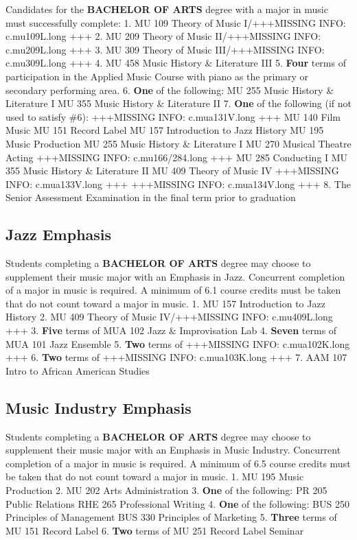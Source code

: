 \documentclass[
  letterpaper,
]{scrbook}
\begin{document}
Candidates for the \textbf{BACHELOR OF ARTS} degree with a major in
music must successfully complete: 1. MU 109 Theory of Music I/+++MISSING
INFO: c.mu109L.long +++ 2. MU 209 Theory of Music II/+++MISSING INFO:
c.mu209L.long +++ 3. MU 309 Theory of Music III/+++MISSING INFO:
c.mu309L.long +++ 4. MU 458 Music History \& Literature III 5.
\textbf{Four} terms of participation in the Applied Music Course with
piano as the primary or secondary performing area. 6. \textbf{One} of
the following: MU 255 Music History \& Literature I MU 355 Music History
\& Literature II 7. \textbf{One} of the following (if not used to
satisfy \#6): +++MISSING INFO: c.mua131V.long +++ MU 140 Film Music MU
151 Record Label MU 157 Introduction to Jazz History MU 195 Music
Production MU 255 Music History \& Literature I MU 270 Musical Theatre
Acting +++MISSING INFO: c.mu166/284.long +++ MU 285 Conducting I MU 355
Music History \& Literature II MU 409 Theory of Music IV +++MISSING
INFO: c.mua133V.long +++ +++MISSING INFO: c.mua134V.long +++ 8. The
Senior Assessment Examination in the final term prior to graduation

\hypertarget{jazz-emphasis}{%
\subsection{Jazz Emphasis}\label{jazz-emphasis}}

Students completing a \textbf{BACHELOR OF ARTS} degree may choose to
supplement their music major with an Emphasis in Jazz. Concurrent
completion of a major in music is required. A minimum of 6.1 course
credits must be taken that do not count toward a major in music. 1. MU
157 Introduction to Jazz History 2. MU 409 Theory of Music IV/+++MISSING
INFO: c.mu409L.long +++ 3. \textbf{Five} terms of MUA 102 Jazz \&
Improvisation Lab 4. \textbf{Seven} terms of MUA 101 Jazz Ensemble 5.
\textbf{Two} terms of +++MISSING INFO: c.mua102K.long +++ 6.
\textbf{Two} terms of +++MISSING INFO: c.mua103K.long +++ 7. AAM 107
Intro to African American Studies

\hypertarget{music-industry-emphasis}{%
\subsection{Music Industry Emphasis}\label{music-industry-emphasis}}

Students completing a \textbf{BACHELOR OF ARTS} degree may choose to
supplement their music major with an Emphasis in Music Industry.
Concurrent completion of a major in music is required. A minimum of 6.5
course credits must be taken that do not count toward a major in music.
1. MU 195 Music Production 2. MU 202 Arts Administration 3. \textbf{One}
of the following: PR 205 Public Relations RHE 265 Professional Writing
4. \textbf{One} of the following: BUS 250 Principles of Management BUS
330 Principles of Marketing 5. \textbf{Three} terms of MU 151 Record
Label 6. \textbf{Two} terms of MU 251 Record Label Seminar
\end{document}
